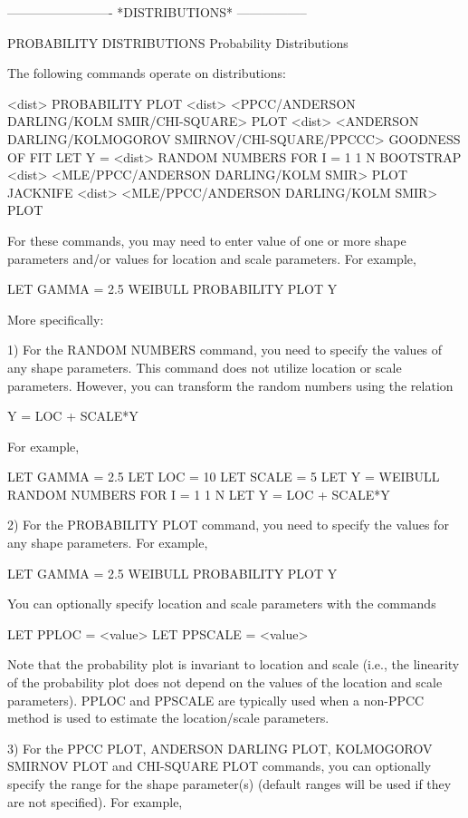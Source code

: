 -------------------------  *DISTRIBUTIONS*  -----------------
 
PROBABILITY DISTRIBUTIONS
Probability Distributions
 
The following commands operate on distributions:

    <dist> PROBABILITY PLOT
    <dist> <PPCC/ANDERSON DARLING/KOLM SMIR/CHI-SQUARE> PLOT
    <dist> <ANDERSON DARLING/KOLMOGOROV SMIRNOV/CHI-SQUARE/PPCCC>
           GOODNESS OF FIT
    LET Y = <dist> RANDOM NUMBERS FOR I = 1 1 N
    BOOTSTRAP <dist> <MLE/PPCC/ANDERSON DARLING/KOLM SMIR> PLOT
    JACKNIFE <dist> <MLE/PPCC/ANDERSON DARLING/KOLM SMIR> PLOT

For these commands, you may need to enter value of one or more
shape parameters and/or values for location and scale parameters.
For example,

   LET GAMMA = 2.5
   WEIBULL PROBABILITY PLOT Y

More specifically:

   1) For the RANDOM NUMBERS command, you need to specify the values
      of any shape parameters.  This command does not utilize location
      or scale parameters.  However, you can transform the random
      numbers using the relation

          Y = LOC + SCALE*Y

      For example,

          LET GAMMA = 2.5
          LET LOC = 10
          LET SCALE = 5
          LET Y = WEIBULL RANDOM NUMBERS FOR I = 1 1 N
          LET Y = LOC + SCALE*Y

   2) For the PROBABILITY PLOT command, you need to specify the
      values for any shape parameters.  For example,

          LET GAMMA = 2.5
          WEIBULL PROBABILITY PLOT Y

      You can optionally specify location and scale parameters with
      the commands

          LET PPLOC = <value>
          LET PPSCALE = <value>

      Note that the probability plot is invariant to location and
      scale (i.e., the linearity of the probability plot does not
      depend on the values of the location and scale parameters).
      PPLOC and PPSCALE are typically used when a non-PPCC method
      is used to estimate the location/scale parameters.
      
   3) For the PPCC PLOT, ANDERSON DARLING PLOT, KOLMOGOROV SMIRNOV PLOT
      and CHI-SQUARE PLOT commands, you can optionally specify the
      range for the shape parameter(s) (default ranges will be used if
      they are not specified).  For example,

